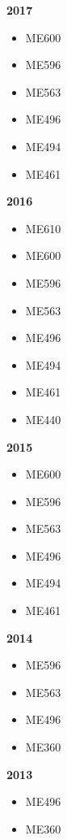 \textbf{2017}
\begin{itemize}
  \item ME600
  \item ME596
  \item ME563
  \item ME496
  \item ME494
  \item ME461
\end{itemize}

\textbf{2016}
\begin{itemize}
  \item ME610
  \item ME600
  \item ME596
  \item ME563
  \item ME496
  \item ME494
  \item ME461
  \item ME440
\end{itemize}

\textbf{2015}
\begin{itemize}
  \item ME600
  \item ME596
  \item ME563
  \item ME496
  \item ME494
  \item ME461
\end{itemize}

\textbf{2014}
\begin{itemize}
  \item ME596
  \item ME563
  \item ME496
  \item ME360
\end{itemize}

\textbf{2013}
\begin{itemize}
  \item ME496
  \item ME360
\end{itemize}

